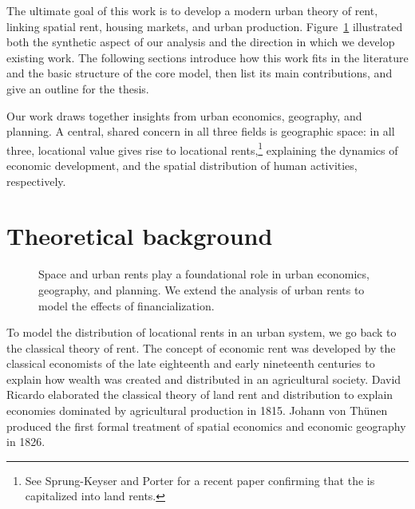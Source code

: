 
The ultimate goal of this work is to develop a modern urban theory of rent, linking spatial rent, housing markets, and urban production. 
Figure~\ref{fig-fields} illustrated both the synthetic aspect of our analysis and the direction in which we develop existing work. The following sections introduce how this work fits in the literature and the basic structure of the core model, then list its main contributions, and give an outline for the thesis.

Our work draws together insights from urban economics, geography, and planning. A central, shared concern in all three fields is geographic space: in all three, locational value gives rise to locational rents,\footnote{See Sprung-Keyser and Porter \cite{medina-olivaresJointModelLongitudinal2023} for a recent paper confirming that the is capitalized into land rents.}  explaining the dynamics of economic development, and the spatial distribution of human activities, respectively. 

\section{Theoretical background}

    
    \begin{figure}[!ht]
    \centering
    
    \caption[Linking space and urban rents to the effects of financialization]{Space and urban rents play a foundational role in urban economics, geography, and planning. We extend the analysis of urban rents to model the effects of financialization.}
    \label{fig-fields}
    \end{figure}


To model the distribution of locational rents in an urban system, we go back to the classical theory of rent. The concept of economic rent was developed by the classical economists of the late eighteenth and early nineteenth centuries to explain how wealth was created and distributed in an agricultural society. David Ricardo \cite{ricardoEssayInfluenceLow1815} elaborated the classical theory of land rent and distribution to explain economies dominated by agricultural production in 1815.
Johann von Th\"unen \cite{vonthunenIsolirteStaatBeziehung1826} produced the first formal treatment of spatial economics and economic geography in 1826. 

